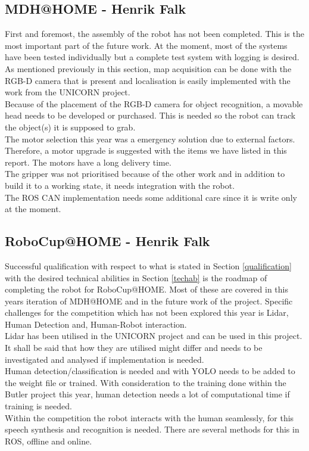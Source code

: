 \subsection*{MDH@HOME - Henrik Falk} %
    
        First and foremost, the assembly of the robot has not been completed. This is the most important part of the future work. At the moment, most of the systems have been tested individually but a complete test system with logging is desired.\\
        \indent As mentioned previously in this section, map acquisition can be done with the RGB-D camera that is present and localisation is easily implemented with the work from the UNICORN project.\\
        \indent Because of the placement of the RGB-D camera for object recognition, a movable head needs to be developed or purchased. This is needed so the robot can track the object(s) it is supposed to grab.\\
        \indent The motor selection this year was a emergency solution due to external factors. Therefore, a motor upgrade is suggested with the items we have listed in this report. The motors have a long delivery time.\\
        \indent The gripper was not prioritised because of the other work and in addition to build it to a working state, it needs integration with the robot.\\
        \indent The ROS CAN implementation needs some additional care since it is write only at the moment.
    
    
\subsection*{RoboCup@HOME - Henrik Falk} %
    
        Successful qualification with respect to what is stated in Section \ref{qualification} with the desired technical abilities in Section \ref{techab} is the roadmap of completing the robot for RoboCup@HOME. Most of these are covered in this years iteration of MDH@HOME and in the future work of the project. Specific challenges for the competition which has not been explored this year is Lidar, Human Detection and, Human-Robot interaction.\\
        \indent Lidar has been utilised in the UNICORN project and can be used in this project. It shall be said that how they are utilised might differ and needs to be investigated and analysed if implementation is needed.\\
        \indent Human detection/classification is needed and with YOLO needs to be added to the weight file or trained. With consideration to the training done within the Butler project this year, human detection needs a lot of computational time if training is needed.\\
        \indent Within the competition the robot interacts with the human seamlessly, for this speech synthesis and recognition is needed. There are several methods for this in ROS, offline and online.


